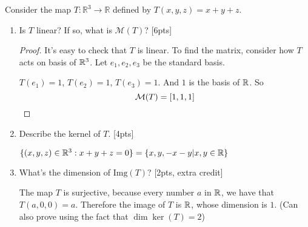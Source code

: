 \documentclass{amsart}
\begin{document}
	
\vspace{2em}

Consider the map $T:\mathbb{R}^3\to\mathbb{R}$ defined by $T(x,y,z)=x+y+z$.

\begin{enumerate}
\item  Is $T$ linear? If so, what is $\mathcal{M}(T)$? [6pts]
\begin{proof}
	It's easy to check that $T$ is linear. To find the matrix, consider how $T$ acts on basis of $\mathbb{R}^3$. Let $e_1,e_2,e_3$ be the standard basis.
	
	$T(e_1)=1$, $T(e_2)=1$, $T(e_3)=1$. And $1$ is the basis of $\mathbb{R}$. So
	\[\mathcal{M}(T)=[1,1,1]\qedhere\]
\end{proof}

\item Describe the kernel of $T$. [4pts]

$\{(x,y,z)\in\mathbb{R}^3:x+y+z=0\}=\{x,y,-x-y|x,y\in\mathbb{R}\}$
\item What's the dimension of $\text{Img}(T)$? [2pts, extra credit]

The map $T$ is surjective, because every number $a$ in $\mathbb{R}$, we have that $T(a,0,0)=a$. Therefore the image of $T$ is $\mathbb{R}$, whose dimension is $1$. (Can also prove using the fact that $\dim \ker(T)=2$)


\end{enumerate}


%
%
\end{document}
